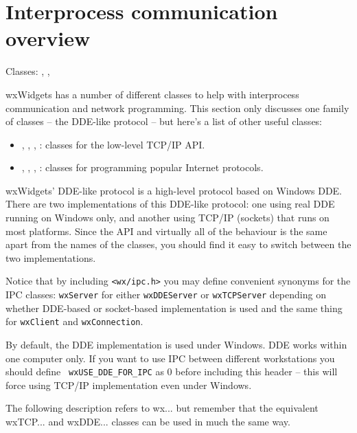 \section{Interprocess communication overview}\label{ipcoverview}

Classes: ,
,

wxWidgets has a number of different classes to help with
interprocess communication and network programming. This section
only discusses one family of classes -- the DDE-like protocol --
but here's a list of other useful classes:

\begin{itemize}\itemsep=0pt
\item {},
,
,
: classes for the low-level TCP/IP API.
\item {}, , , : classes
for programming popular Internet protocols.
\end{itemize}

wxWidgets' DDE-like protocol is a high-level protocol based on
Windows DDE. There are two implementations of this DDE-like
protocol: one using real DDE running on Windows only, and another
using TCP/IP (sockets) that runs on most platforms. Since the API
and virtually all of the behaviour is the same apart from the
names of the classes, you should find it easy to switch between
the two implementations.

Notice that by including {\tt <wx/ipc.h>} you may define
convenient synonyms for the IPC classes: {\tt wxServer} for either
{\tt wxDDEServer} or {\tt wxTCPServer} depending on whether
DDE-based or socket-based implementation is used and the same
thing for {\tt wxClient} and {\tt wxConnection}.

By default, the DDE implementation is used under Windows. DDE works
within one computer only. If you want to use IPC between
different workstations you should define {\tt
wxUSE\_DDE\_FOR\_IPC} as $0$ before including this header -- this
will force using TCP/IP implementation even under Windows.

The following description refers to wx... but remember that the
equivalent wxTCP... and wxDDE... classes can be used in much the
same way.

